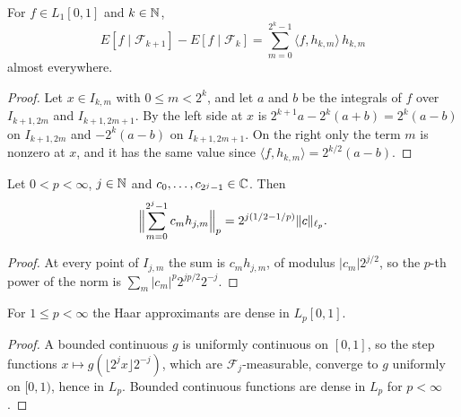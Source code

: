 \begin{lemma}
\label{lem:haar-martingale}
\leanok
{}
For $f \in L_1[0, 1]$ and $k \in \mathbb{N}$,
\[
  E[f \mid \mathcal{F}_{k+1}] - E[f \mid \mathcal{F}_k]
  = \sum_{m=0}^{2^k - 1} \langle f, h_{k,m} \rangle \, h_{k,m}
\]
almost everywhere.
\end{lemma}

\begin{proof}
\leanok
Let $x \in I_{k,m}$ with $0 \leq m < 2^k$, and let $a$ and $b$ be the integrals of $f$ over
$I_{k+1,2m}$ and $I_{k+1,2m+1}$. By  the left side at $x$ is
$2^{k+1} a - 2^k (a + b) = 2^k (a - b)$ on $I_{k+1,2m}$ and $-2^k (a - b)$ on $I_{k+1,2m+1}$.
On the right only the term $m$ is nonzero at $x$, and it has the same value since
$\langle f, h_{k,m} \rangle = 2^{k/2} (a - b)$.
\end{proof}

\begin{lemma}
\label{lem:haar-level}
\leanok
{}
Let $0 < p < \infty$, $j \in \mathbb{N}$ and $c_0, \dots, c_{2^j - 1} \in \mathbb{C}$. Then
\[
  \Bigl\| \sum_{m=0}^{2^j - 1} c_m h_{j,m} \Bigr\|_p = 2^{j(1/2 - 1/p)} \|c\|_{\ell_p} .
\]
\end{lemma}

\begin{proof}
\leanok
At every point of $I_{j,m}$ the sum is $c_m h_{j,m}$, of modulus $|c_m| 2^{j/2}$, so the
$p$-th power of the norm is $\sum_m |c_m|^p 2^{jp/2} 2^{-j}$.
\end{proof}

\begin{lemma}
\label{lem:haar-density}
\leanok
{}
For $1 \leq p < \infty$ the Haar approximants are dense in $L_p[0, 1]$.
\end{lemma}

\begin{proof}
\leanok
A bounded continuous $g$ is uniformly continuous on $[0, 1]$, so the step functions
$x \mapsto g(\lfloor 2^j x \rfloor 2^{-j})$, which are $\mathcal{F}_j$-measurable, converge to
$g$ uniformly on $[0, 1)$, hence in $L_p$. Bounded continuous functions are dense in $L_p$ for
$p < \infty$.
\end{proof}

